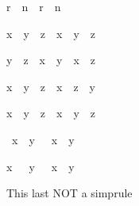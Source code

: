 \begin{isabellebody}
\begin{isamarkuptext}
\begin{isabelle}%
{\isasymbar}r{\isasymbar}\ {\isacharcircum}\ n\ {\isacharequal}\ {\isasymbar}r\ {\isacharcircum}\ n{\isasymbar}%
\end{isabelle}

\begin{isabelle}%
x\ {\isacharasterisk}\ {\isacharparenleft}y\ {\isacharslash}\ z{\isacharparenright}\ {\isacharequal}\ x\ {\isacharasterisk}\ y\ {\isacharslash}\ z%
\end{isabelle}

\begin{isabelle}%
y\ {\isacharslash}\ z\ {\isacharasterisk}\ x\ {\isacharequal}\ y\ {\isacharasterisk}\ x\ {\isacharslash}\ z%
\end{isabelle}

\begin{isabelle}%
x\ {\isacharslash}\ {\isacharparenleft}y\ {\isacharslash}\ z{\isacharparenright}\ {\isacharequal}\ x\ {\isacharasterisk}\ z\ {\isacharslash}\ y%
\end{isabelle}

\begin{isabelle}%
x\ {\isacharslash}\ y\ {\isacharslash}\ z\ {\isacharequal}\ x\ {\isacharslash}\ {\isacharparenleft}y\ {\isacharasterisk}\ z{\isacharparenright}%
\end{isabelle}

\begin{isabelle}%
{\isacharminus}\ x\ {\isacharslash}\ y\ {\isacharequal}\ {\isacharminus}\ {\isacharparenleft}x\ {\isacharslash}\ y{\isacharparenright}%
\end{isabelle}

\begin{isabelle}%
x\ {\isacharslash}\ {\isacharminus}\ y\ {\isacharequal}\ {\isacharminus}\ {\isacharparenleft}x\ {\isacharslash}\ y{\isacharparenright}%
\end{isabelle}

This last NOT a simprule


\end{isamarkuptext}
\end{isabellebody}
